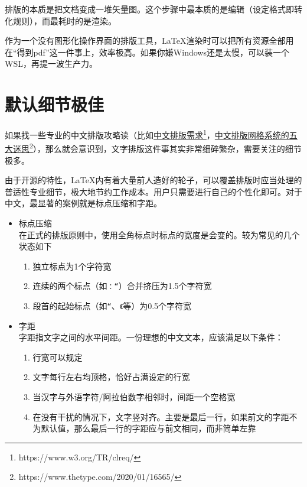 \documentclass[10pt,openany]{book}
\newenvironment{tightitem}
{\begin{itemize}[topsep=0pt,partopsep=0pt,itemsep=0pt,parsep=0pt,leftmargin=3\ccwd,labelwidth=1.5\ccwd,labelsep=.5\ccwd]}
        {\end{itemize}}
\newenvironment{tightenum}
{\begin{enumerate}[topsep=0pt,partopsep=0pt,itemsep=0pt,parsep=0pt,leftmargin=3\ccwd,labelwidth=1.5\ccwd,labelsep=.5\ccwd]}
        {\end{enumerate}}
\begin{document}
排版的本质是把文档变成一堆矢量图。这个步骤中最本质的是编辑（设定格式即转化规则），而最耗时的是渲染。

作为一个没有图形化操作界面的排版工具，\LaTeX 渲染时可以把所有资源全部用在“得到pdf”这一件事上，效率极高。如果你嫌Windows还是太慢，可以装一个WSL，再提一波生产力。

\section{默认细节极佳}

如果找一些专业的中文排版攻略读（比如\href{https://www.w3.org/TR/clreq/}{中文排版需求\footnote{https://www.w3.org/TR/clreq/}}，\href{https://www.thetype.com/2020/01/16565/}{中文排版网格系统的五大迷思\footnote{https://www.thetype.com/2020/01/16565/}}），那么就会意识到，文字排版这件事其实非常细碎繁杂，需要关注的细节极多。

由于开源的特性，\LaTeX 内有着大量前人造好的轮子，可以覆盖排版时应当处理的普适性专业细节，极大地节约工作成本。用户只需要进行自己的个性化即可。对于中文，最显著的案例就是标点压缩和字距。

\begin{tightitem}
    \item 标点压缩\\在正式的排版原则中，使用全角标点时标点的宽度是会变的。较为常见的几个状态如下
    \begin{tightenum}
        \item 独立标点为1个字符宽
        \item 连续的两个标点（如\texttt{：“}）合并挤压为1.5个字符宽
        \item 段首的起始标点（如\texttt{“}、\texttt{《}等）为0.5个字符宽
    \end{tightenum}
    \item 字距\\字距指文字之间的水平间距。一份理想的中文文本，应该满足以下条件：
    \begin{tightenum}
        \item 行宽可以规定
        \item 文字每行左右均顶格，恰好占满设定的行宽
        \item 当汉字与外语字符/阿拉伯数字相邻时，间距一个空格宽
        \item 在没有干扰的情况下，文字竖对齐。主要是最后一行，如果前文的字距不为默认值，那么最后一行的字距应与前文相同，而非简单左靠
    \end{tightenum}
\end{tightitem}
\end{document}
